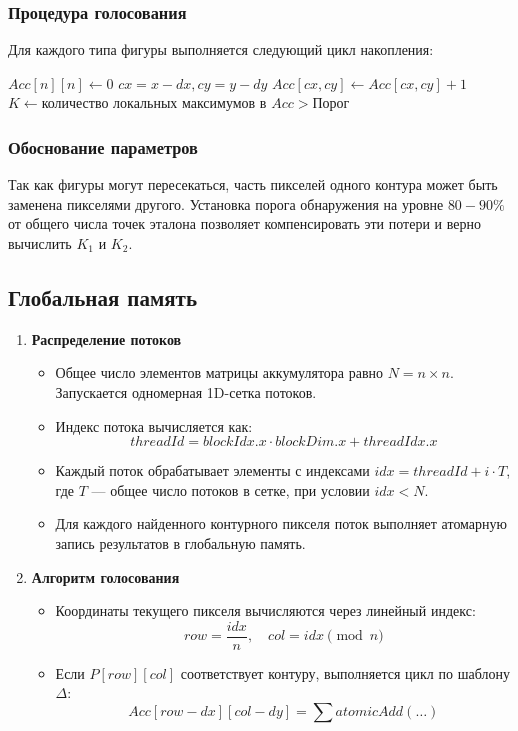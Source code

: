 \documentclass{article}[14pt]
\begin{document}
\subsubsection*{Процедура голосования}
Для каждого типа фигуры выполняется следующий цикл накопления:

\begin{algorithmic}[1]
\State $Acc[n][n] \gets 0$ 
                \State $cx = x - dx, cy = y - dy$
                    \State $Acc[cx, cy] \gets Acc[cx, cy] + 1$
                \EndIf
            \EndFor
        \EndIf
    \EndFor
\EndFor
\State $K \gets \text{количество локальных максимумов в } Acc > \text{Порог}$
\end{algorithmic}

\subsubsection*{Обоснование параметров}
Так как фигуры могут пересекаться, часть пикселей одного контура может быть заменена пикселями другого. Установка порога обнаружения на 
уровне $80-90\%$ от общего числа точек эталона позволяет компенсировать эти потери и верно вычислить $K_1$ и $K_2$.


\subsection{Глобальная память}

\begin{enumerate}
    \item \textbf{Распределение потоков}
    \begin{itemize}
        \item Общее число элементов матрицы аккумулятора равно $N = n \times n$. Запускается одномерная 1D-сетка потоков.
        \item Индекс потока вычисляется как:
        \[ threadId = blockIdx.x \cdot blockDim.x + threadIdx.x \]
        \item Каждый поток обрабатывает элементы с индексами $idx = threadId + i \cdot T$, где $T$ — общее число потоков в сетке, при условии $idx < N$.
        \item Для каждого найденного контурного пикселя поток выполняет атомарную запись результатов в глобальную память.
    \end{itemize}

    \item \textbf{Алгоритм голосования}
    \begin{itemize}
        \item Координаты текущего пикселя вычисляются через линейный индекс:
        \[ row = \frac{idx}{n}, \quad col = idx \pmod n \]
        \item Если $P[row][col]$ соответствует контуру, выполняется цикл по шаблону $\Delta$:
        \[ Acc[row - dx][col - dy] = \sum atomicAdd(\dots) \]
    \end{itemize}
\end{enumerate}
\end{document}

